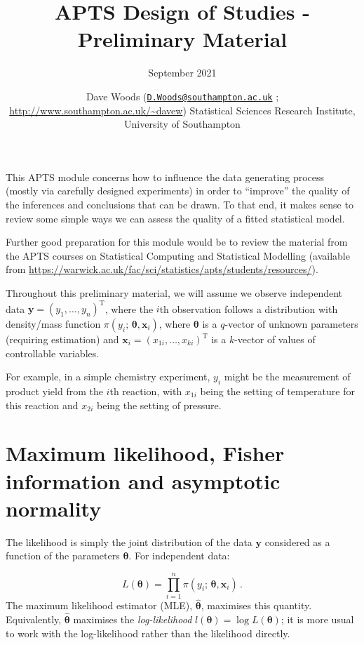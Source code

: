 \documentclass[
]{article}
\title{APTS Design of Studies - Preliminary Material}
\subtitle{September 2021}
\author{Dave Woods
(\href{mailto:D.Woods@southampton.ac.uk}{\nolinkurl{D.Woods@southampton.ac.uk}}
; \url{http://www.southampton.ac.uk/~davew}) Statistical Sciences
Research Institute, University of Southampton}
\date{}
\begin{document}
\maketitle

\newcommand{\bx}{\boldsymbol{x}}
\newcommand{\btheta}{\boldsymbol{\theta}}
\newcommand{\bbeta}{\boldsymbol{\beta}}
\newcommand{\bvarepsilon}{\boldsymbol{\varepsilon}}
\newcommand{\by}{\boldsymbol{y}}
\newcommand{\rT}{\mathrm{T}}
\newcommand{\Var}{\operatorname{Var}}

This APTS module concerns how to influence the data generating process
(mostly via carefully designed experiments) in order to ``improve'' the
quality of the inferences and conclusions that can be drawn. To that
end, it makes sense to review some simple ways we can assess the quality
of a fitted statistical model.

Further good preparation for this module would be to review the material
from the APTS courses on Statistical Computing and Statistical Modelling
(available from
\url{https://warwick.ac.uk/fac/sci/statistics/apts/students/resources/}).

Throughout this preliminary material, we will assume we observe
independent data \(\boldsymbol{y}= (y_1,\ldots, y_n)^\mathrm{T}\), where
the \(i\)th observation follows a distribution with density/mass
function \(\pi(y_i;\,\boldsymbol{\theta}, \boldsymbol{x}_i)\), where
\(\boldsymbol{\theta}\) is a \(q\)-vector of unknown parameters
(requiring estimation) and
\(\boldsymbol{x}_i = (x_{1i},\ldots,x_{ki})^\mathrm{T}\) is a
\(k\)-vector of values of controllable variables.

For example, in a simple chemistry experiment, \(y_i\) might be the
measurement of product yield from the \(i\)th reaction, with \(x_{1i}\)
being the setting of temperature for this reaction and \(x_{2i}\) being
the setting of pressure.

\hypertarget{maximum-likelihood-fisher-information-and-asymptotic-normality}{%
\section{Maximum likelihood, Fisher information and asymptotic
normality}\label{maximum-likelihood-fisher-information-and-asymptotic-normality}}

The likelihood is simply the joint distribution of the data
\(\boldsymbol{y}\) considered as a function of the parameters
\(\boldsymbol{\theta}\). For independent data:

\[
\begin{equation}\label{eq:likelihood}
L(\boldsymbol{\theta}) = \prod_{i=1}^n \pi(y_i;\,\boldsymbol{\theta}, \boldsymbol{x}_i)\,.
\end{equation}
\] The maximum likelihood estimator (MLE),
\(\hat{\boldsymbol{\theta}}\), maximises this quantity. Equivalently,
\(\hat{\boldsymbol{\theta}}\) maximises the \emph{log-likelihood}
\(l(\boldsymbol{\theta}) = \log L(\boldsymbol{\theta})\); it is more
usual to work with the log-likelihood rather than the likelihood
directly.
\end{document}
